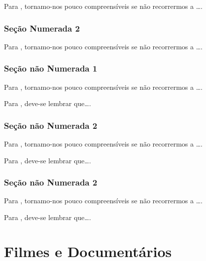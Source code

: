 \documentclass[
]{book}
\begin{document}
Para \citet{BOCK2001}, tornamo-nos pouco compreensíveis se não recorrermos a \ldots.

\hypertarget{seuxe7uxe3o-numerada-2-29}{%
\subsection{Seção Numerada 2}\label{seuxe7uxe3o-numerada-2-29}}

Para \citet{BOCK2001}, tornamo-nos pouco compreensíveis se não recorrermos a \ldots.

\hypertarget{seuxe7uxe3o-nuxe3o-numerada-1-59}{%
\subsection*{Seção não Numerada 1}\label{seuxe7uxe3o-nuxe3o-numerada-1-59}}

Para \citet{BOCK2001}, tornamo-nos pouco compreensíveis se não recorrermos a \ldots.

Para \citet{DAVIDOFF2001}, deve-se lembrar que\ldots.

\hypertarget{seuxe7uxe3o-nuxe3o-numerada-2-88}{%
\subsection*{Seção não Numerada 2}\label{seuxe7uxe3o-nuxe3o-numerada-2-88}}

Para \citet{BOCK2001}, tornamo-nos pouco compreensíveis se não recorrermos a \ldots.

Para \citet{DAVIDOFF2001}, deve-se lembrar que\ldots.

\hypertarget{seuxe7uxe3o-nuxe3o-numerada-2-89}{%
\subsection*{Seção não Numerada 2}\label{seuxe7uxe3o-nuxe3o-numerada-2-89}}

Para \citet{BOCK2001}, tornamo-nos pouco compreensíveis se não recorrermos a \ldots.

Para \citet{DAVIDOFF2001}, deve-se lembrar que\ldots.

\hypertarget{filmes-e-documentuxe1rios-1}{%
\chapter{Filmes e Documentários}\label{filmes-e-documentuxe1rios-1}}
\end{document}
